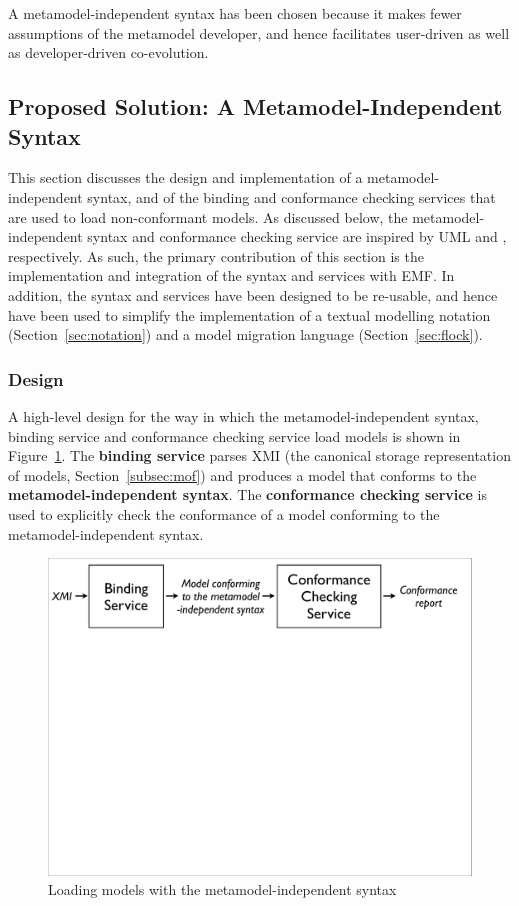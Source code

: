 A metamodel-independent syntax has been chosen because it makes fewer assumptions of the metamodel developer, and hence facilitates user-driven as well as developer-driven co-evolution.


\subsection{Proposed Solution: A Metamodel-Independent Syntax}
\label{subsec:binding}
This section discusses the design and implementation of a metamodel-ind\-ep\-en\-de\-nt syntax, and of the binding and conformance checking services that are used to load non-conformant models. As discussed below, the metamodel-independent syntax and conformance checking service are inspired by UML \cite{uml22} and \cite{paige07metamodel}, respectively. As such, the primary contribution of this section is the implementation and integration of the syntax and services with EMF. In addition, the syntax and services have been designed to be re-usable, and hence have been used to simplify the implementation of a textual modelling notation (Section~\ref{sec:notation}) and a model migration language (Section~\ref{sec:flock}).

\subsubsection{Design}
A high-level design for the way in which the metamodel-independent syntax, binding service and conformance checking service load models is shown in Figure~\ref{fig:mmi_workflow}. The \textbf{binding service} parses XMI (the canonical storage representation of models, Section~\ref{subsec:mof}) and produces a model that conforms to the \textbf{metamodel-independent syntax}. The \textbf{conformance checking service} is used to explicitly check the conformance of a model conforming to the metamodel-independent syntax.

\begin{figure}[htbp]
	\centering
		\includegraphics*[viewport=10 590 990 760,width=11.5cm]{5.Implementation/images/mmi_workflow.pdf}
	\caption{Loading models with the metamodel-independent syntax}
	\label{fig:mmi_workflow}
\end{figure}

